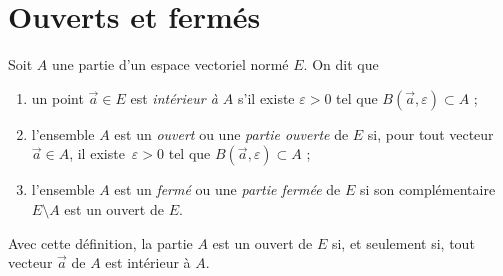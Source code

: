 \section{Ouverts et fermés}

\begin{defn}
	Soit $A$ une partie d'un espace vectoriel normé $E$. On dit que
	\begin{enumerate}
		\item un point $\vec{a} \in E$ est \textit{intérieur à $A$} s'il existe $\varepsilon > 0$ tel que $B(\vec{a}, \varepsilon) \subset A$ ;
		\item l'ensemble $A$ est un \textit{ouvert} ou une \textit{partie ouverte} de $E$ si, pour tout vecteur $\vec{a} \in A$, il existe~$\varepsilon > 0$ tel que $B(\vec a, \varepsilon) \subset A$ ;
		\item l'ensemble $A$ est un \textit{fermé} ou une \textit{partie fermée} de $E$ si son complémentaire $E\setminus A$ est un ouvert de $E$.
	\end{enumerate}
\end{defn}

Avec cette définition, la partie $A$ est un ouvert de $E$ si, et seulement si, tout vecteur $\vec{a}$ de $A$ est intérieur à $A$.

